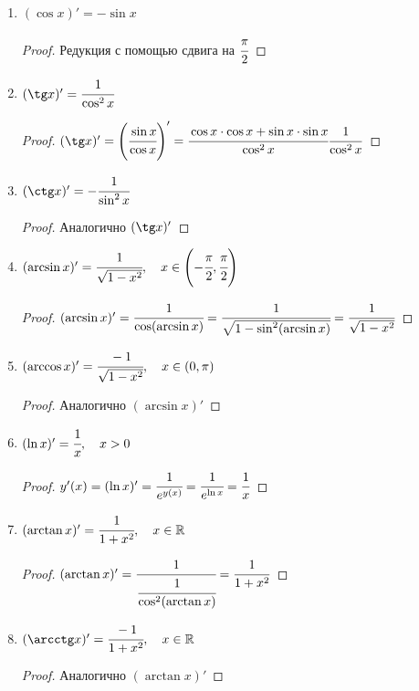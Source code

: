 \begin{corollary}
\begin{enumerate}
\begin{proof}
        $$ = \cfrac{\sin x_{0} \cdot \cos (\Delta x) + \cos x_{0} \cdot \sin (\Delta x) -\sin x_{0}}{\Delta x} = \cos x_{0}
        $$
        \end{proof}
        \item $(\cos x)' = - \sin x $
        \begin{proof}
            Редукция с помощью сдвига на $\cfrac{\pi}{2}$
        \end{proof}
        \item $(\tg x)' = \cfrac{1}{\cos^{2} x}$
        \begin{proof}
            $(\tg x)' = \left( \cfrac{\sin x}{\cos x} \right)'= \cfrac{\cos x\cdot \cos x + \sin x \cdot \sin x}{\cos^{2} x}  \cfrac{1}{\cos^{2} x}$
        \end{proof}
        \item $(\ctg x)' = -\cfrac{1}{\sin^{2} x}$
        \begin{proof}
            Аналогично $(\tg x)'$
        \end{proof}
        \item $(\arcsin x)' = \cfrac{1}{\sqrt{1 - x^{2}}}, \quad x \in \left(-\cfrac{\pi}{2}, \cfrac{\pi}{2}\right)$
        \begin{proof}
            $(\arcsin x)' = \cfrac{1}{\cos(\arcsin x)} = \cfrac{1}{\sqrt{1-\sin^{2}(\arcsin x)}} = \cfrac{1}{\sqrt{1 - x^{2}}}$
        \end{proof}
        \item $(\arccos x)' = \cfrac{-1}{\sqrt{1-x^{2}}}, \quad x \in (0, \pi )$
        \begin{proof}
            Аналогично $(\arcsin x)'$
        \end{proof}
        \item $(\ln x)' = \cfrac{1}{x},  \quad x > 0$
        \begin{proof}
            $y'(x) = (\ln x)' = \cfrac{1}{e^{y(x)}} = \cfrac{1}{e^{\ln x}} = \cfrac{1}{x}$
        \end{proof}
        \item $(\arctan x)' = \cfrac{1}{1 + x^{2}}, \quad x\in \mathbb{R} $
        \begin{proof}
            $(\arctan x)' = \cfrac{1}{\cfrac{1}{\cos^{2}(\arctan x)}} = \cfrac{1}{1+x^{2}}$
        \end{proof}
        \item $(\arcctg x)' = \cfrac{-1}{1 + x^2}, \quad x \in \R$
        \begin{proof}
            Аналогично $(\arctan x)'$
        \end{proof}

\end{enumerate}
\end{corollary}
